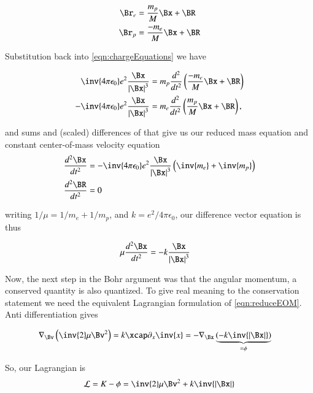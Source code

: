 \documentclass{article}
\newcommand{\K}[0]{\inv{4 \pi \epsilon_0}}
\begin{document}
\begin{align*}
\Br_e &= \frac{m_p}{M} \Bx + \BR \\
\Br_p &= \frac{-m_e}{M} \Bx + \BR \\
\end{align*}


Substitution back into \ref{eqn:chargeEquations} we have

\begin{align*}
  \K e^2 \frac {\Bx} { \Abs{\Bx}^3 } &= m_p \frac{d^2}{dt^2}\left( \frac{-m_e}{M} \Bx + \BR \right) \\
 -\K e^2 \frac {\Bx} { \Abs{\Bx}^3 } &= m_e \frac{d^2}{dt^2}\left( \frac{m_p}{M} \Bx + \BR \right),
\end{align*}

and sums and (scaled) differences of that give us our reduced mass equation and constant center-of-mass velocity equation
\begin{align}
\frac{d^2 \Bx}{dt^2} &= -\K e^2 \frac {\Bx} { \Abs{\Bx}^3 } \left( \inv{m_e} + \inv{m_p} \right) \\
\frac{d^2 \BR}{dt^2} &= 0
\end{align}

writing $1/\mu = 1/m_e + 1/m_p$, and $k = e^2/4 \pi \epsilon_0$, our difference vector equation is thus

\begin{align}\label{eqn:reduceEOM}
\mu \frac{d^2 \Bx}{dt^2} &= -k \frac {\Bx} { \Abs{\Bx}^3 }
\end{align}

Now, the next step in the Bohr argument was that the angular momentum, a conserved quantity is also quantized.  To give real
meaning to the conservation statement we need the equivalent Lagrangian formulation of \ref{eqn:reduceEOM}.  Anti differentiation
gives

\begin{align*}
\grad_\Bv \left( \inv{2} \mu \Bv^2 \right) &= k \xcap \partial_x \inv{x} = - \grad_\Bx \underbrace{\left(- k\inv{\Abs{\Bx}}\right)}_{=\phi}
\end{align*}

So, our Lagrangian is
\begin{align*}
\LL = K - \phi = \inv{2} \mu \Bv^2 + k \inv{\Abs{\Bx}}
\end{align*}

%

%
%
\end{document}
